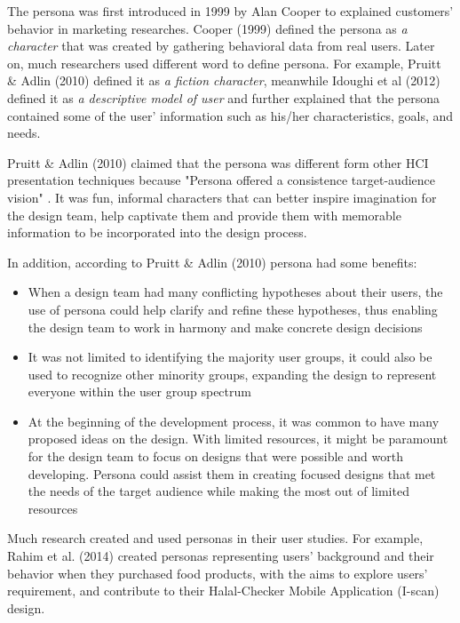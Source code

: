 The persona was first introduced in 1999 by Alan Cooper \cite{copper1999inmates} to explained customers' behavior in marketing researches. Cooper (1999) \cite{copper1999inmates} defined the persona as \textit{a character} that was created by gathering behavioral data from real users. Later on, much researchers used different word to define persona. For example, Pruitt \& Adlin (2010) \cite{pruitt2010persona} defined it as \textit{a fiction character}, meanwhile Idoughi et al (2012) \cite{idoughi2012adding} defined it as \textit{a descriptive model of user} and further explained that the persona contained some of the user' information such as his/her characteristics, goals, and needs.

Pruitt \& Adlin (2010) \cite{pruitt2010persona} claimed that the persona was different form other HCI presentation techniques because "Persona offered a consistence target-audience vision" \cite[pp.18]{pruitt2010persona}. It was fun, informal characters that can better inspire imagination for the design team, help captivate them and provide them with memorable information to be incorporated into the design process. 

In addition, according to Pruitt \& Adlin (2010) \cite{pruitt2010persona} persona had some benefits:

\begin{itemize}
\item When a design team had many conflicting hypotheses about their users, the use of persona could help clarify and refine these hypotheses, thus enabling the design team to work in harmony and make concrete design decisions
\item It was not limited to identifying the majority user groups, it could also be used to recognize other minority groups, expanding the design to represent everyone within the user group spectrum
\item At the beginning of the development process, it was common to have many proposed ideas on the design. With limited resources, it might be paramount for the design team to focus on designs that were possible and worth developing. Persona could assist them in creating focused designs that met the needs of the target audience while making the most out of limited resources
\end{itemize}

Much research created and used personas in their user studies. For example, Rahim et al. (2014) \cite{rahim2014engineering} created personas representing users' background and their behavior when they purchased food products, with the aims to explore users' requirement, and contribute to their Halal-Checker Mobile Application (I-scan) design. 

